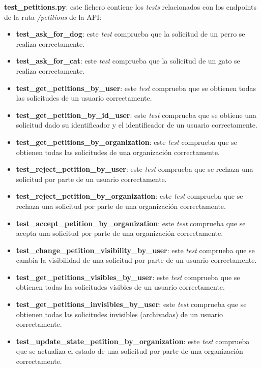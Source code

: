 \textbf{test\_petitions.py}: este fichero contiene los \textit{tests} relacionados con los endpoints de la ruta \textit{/petitions} de la API:

\begin{itemize}
    \item \textbf{test\_ask\_for\_dog}: este \textit{test} comprueba que la solicitud de un perro se realiza correctamente.
    \item \textbf{test\_ask\_for\_cat}: este \textit{test} comprueba que la solicitud de un gato se realiza correctamente.
    \item \textbf{test\_get\_petitions\_by\_user}: este \textit{test} comprueba que se obtienen todas las solicitudes de un usuario correctamente.
    \item \textbf{test\_get\_petition\_by\_id\_user}: este \textit{test} comprueba que se obtiene una solicitud dado su identificador y el identificador de un usuario correctamente.
    \item \textbf{test\_get\_petitions\_by\_organization}: este \textit{test} comprueba que se obtienen todas las solicitudes de una organización correctamente.
    \item \textbf{test\_reject\_petition\_by\_user}: este \textit{test} comprueba que se rechaza una solicitud por parte de un usuario correctamente.
    \item \textbf{test\_reject\_petition\_by\_organization}: este \textit{test} comprueba que se rechaza una solicitud por parte de una organización correctamente.
    \item \textbf{test\_accept\_petition\_by\_organization}: este \textit{test} comprueba que se acepta una solicitud por parte de una organización correctamente.
    \item \textbf{test\_change\_petition\_visibility\_by\_user}: este \textit{test} comprueba que se cambia la visibilidad de una solicitud por parte de un usuario correctamente.
    \item \textbf{test\_get\_petitions\_visibles\_by\_user}: este \textit{test} comprueba que se obtienen todas las solicitudes visibles de un usuario correctamente.
    \item \textbf{test\_get\_petitions\_invisibles\_by\_user}: este \textit{test} comprueba que se obtienen todas las solicitudes invisibles (archivadas) de un usuario correctamente.
    \item \textbf{test\_update\_state\_petition\_by\_organization}: este \textit{test} comprueba que se actualiza el estado de una solicitud por parte de una organización correctamente.

\end{itemize}
